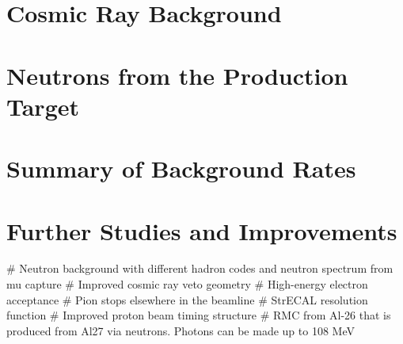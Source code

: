 \section{Cosmic Ray Background}

\section{Neutrons from the Production Target}

\section{Summary of Background Rates}

\section{Further Studies and Improvements}
\begin{easylist}
# Neutron background with different hadron codes and \alcap neutron spectrum from mu capture
# Improved cosmic ray veto geometry
# High-energy electron acceptance
# Pion stops elsewhere in the beamline
# StrECAL resolution function
# Improved proton beam timing structure 
# RMC from Al-26 that is produced from Al27 via neutrons. Photons can be made up to 108 MeV
\end{easylist}
